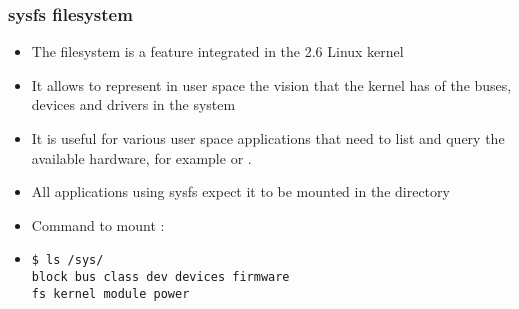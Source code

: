 \begin{frame}[fragile]
  \frametitle{sysfs filesystem}
  \begin{itemize}
  \item The  filesystem is a feature integrated in the 2.6
    Linux kernel
  \item It allows to represent in user space the vision that the kernel
    has of the buses, devices and drivers in the system
  \item It is useful for various user space applications that need to
    list and query the available hardware, for example  or
    .
  \item All applications using sysfs expect it to be mounted in the
     directory
  \item Command to mount :\\
  \item
\begin{verbatim}
$ ls /sys/
block bus class dev devices firmware
fs kernel module power
\end{verbatim}
  \end{itemize}
\end{frame}
